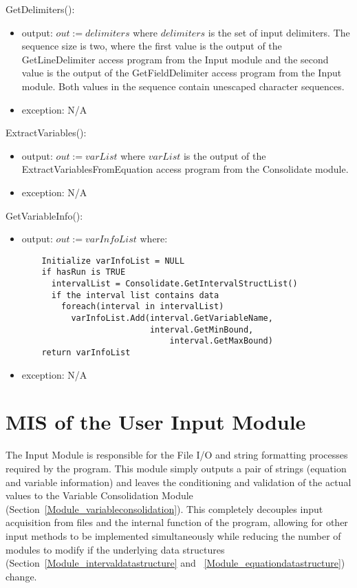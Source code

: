 \documentclass[12pt, titlepage]{article}
\begin{document}
\noindent GetDelimiters():
\begin{itemize}
	\item output: $out := delimiters$ where $delimiters$ is the set of input 
	delimiters. The sequence size is two, where the first value is the output 
	of the GetLineDelimiter access program from the Input module and the second 
	value is the output of the GetFieldDelimiter access program from the Input 
	module. Both values in the sequence contain unescaped character sequences.
	\item exception: N/A
\end{itemize}

\noindent ExtractVariables():
\begin{itemize}
	\item output: $out := varList$ where $varList$ is the output of the 
	ExtractVariablesFromEquation access program from the Consolidate module.
	\item exception: N/A
\end{itemize}

\noindent GetVariableInfo():
\begin{itemize}
	\item output: $out := varInfoList$ where:
	\begin{lstlisting}
	Initialize varInfoList = NULL
	if hasRun is TRUE
	  intervalList = Consolidate.GetIntervalStructList()
	  if the interval list contains data
	    foreach(interval in intervalList)
	      varInfoList.Add(interval.GetVariableName, 
	                      interval.GetMinBound, 
                              interval.GetMaxBound)
    return varInfoList
	\end{lstlisting}
	\item exception: N/A
\end{itemize}

\newpage

\section{MIS of the User Input Module} 
\label{Module_userinput}
The Input Module is responsible for the File I/O and string formatting 
processes required by the program. This module simply outputs a pair of strings 
(equation and variable information) and leaves the conditioning and validation 
of the actual values to the Variable Consolidation Module 
(Section~\ref{Module_variableconsolidation}). This completely decouples input 
acquisition from files and the internal function of the program, allowing for 
other input methods to be implemented simultaneously while reducing the number 
of modules to modify if the underlying data structures 
(Section~\ref{Module_intervaldatastructure} and 
~\ref{Module_equationdatastructure}) change.
\end{document}
